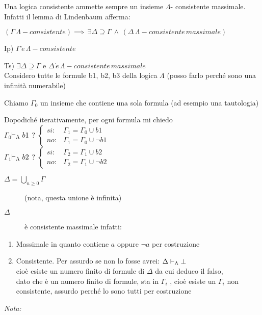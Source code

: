 Una logica consistente ammette sempre un insieme $\Lambda$- consistente
massimale. Infatti il lemma di Lindenbaum afferma:

$(\Gamma\,\Lambda-consistente)\implies\,\exists\Delta\supseteq\Gamma\,\wedge\,(\Delta\,\Lambda-consistente\, massimale)$

Ip) $\Gamma\,\grave{e}\,\Lambda-consistente$

Ts) $\exists\Delta\supseteq\Gamma$ e $\Delta\,\grave{e}\,\Lambda-consistente\, massimale$\\


Considero tutte le formule b1, b2, b3 della logica $\Lambda$ (posso
farlo perché sono una infinità numerabile)

Chiamo $\Gamma_{0}$ un insieme che contiene una sola formula (ad
esempio una tautologia)

Dopodiché iterativamente, per ogni formula mi chiedo\\


$\Gamma_{0}$$\vdash_{\Lambda}b1$ ? $\begin{cases}
si: & \Gamma_{1}=\Gamma_{0}\cup b1\\
no: & \Gamma_{1}=\Gamma_{0}\cup\neg b1
\end{cases}$\\


$\Gamma_{1}$$\vdash_{\Lambda}b2$ ? $\begin{cases}
si: & \Gamma_{2}=\Gamma_{1}\cup b2\\
no: & \Gamma_{2}=\Gamma_{1}\cup\neg b2
\end{cases}$ 
\begin{description}
\item [{$\Delta=\underset{n\geq0}{\bigcup}\Gamma$}] (nota, questa unione
è infinita) 
\item [{$\Delta$}] è consistente massimale infatti:\end{description}
\begin{enumerate}
\item Massimale in quanto contiene $a$ oppure $\neg a$ per costruzione 
\item Consistente. Per assurdo se non lo fosse avrei: $\Delta\vdash_{\Lambda}\bot$\\
 cioè esiste un numero finito di formule di $\Delta$ da cui deduco
il falso,\\
 dato che è un numero finito di formule, sta in $\Gamma_{i}$ , cioè
esiste un $\Gamma_{i}$ non consistente, assurdo perché lo sono tutti
per costruzione \lightning 
\end{enumerate}
\emph{\large{{Nota:}}}{\large \par}

